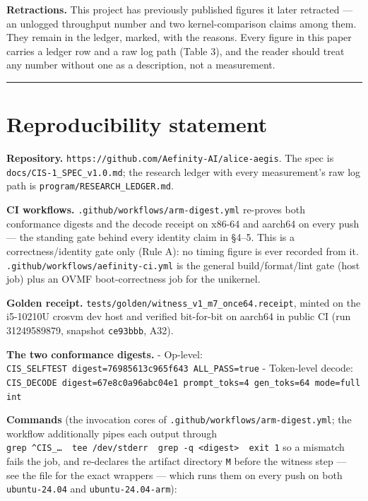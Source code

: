 \documentclass[11pt]{article}
\begin{document}
\textbf{Retractions.} This project has previously published figures it later retracted --- an unlogged
throughput number and two kernel-comparison claims among them. They remain in the ledger, marked,
with the reasons. Every figure in this paper carries a ledger row and a raw log path (Table 3),
and the reader should treat any number without one as a description, not a measurement.

\begin{center}\rule{0.5\linewidth}{0.5pt}\end{center}

\section{Reproducibility statement}\label{reproducibility-statement}

\textbf{Repository.} \texttt{https://github.com/Aefinity-AI/alice-aegis}. The spec is
\texttt{docs/CIS-1\_SPEC\_v1.0.md}; the research ledger with every measurement's raw
log path is \texttt{program/RESEARCH\_LEDGER.md}.

\textbf{CI workflows.} \texttt{.github/workflows/arm-digest.yml} re-proves both
conformance digests and the decode receipt on x86-64 and aarch64 on every
push --- the standing gate behind every identity claim in §4--5. This is a
correctness/identity gate only (Rule A): no timing figure is ever recorded
from it. \texttt{.github/workflows/aefinity-ci.yml} is the general build/format/lint
gate (host job) plus an OVMF boot-correctness job for the unikernel.

\textbf{Golden receipt.} \texttt{tests/golden/witness\_v1\_m7\_once64.receipt}, minted on
the i5-10210U crosvm dev host and verified bit-for-bit on aarch64 in public
CI (run 31249589879, snapshot \texttt{ce93bbb}, A32).

\textbf{The two conformance digests.}
- Op-level: \texttt{CIS\_SELFTEST\ digest=76985613c965f643\ ALL\_PASS=true}
- Token-level decode: \texttt{CIS\_DECODE\ digest=67e8c0a96abc04e1\ prompt\_toks=4\ gen\_toks=64\ mode=fullint}

\textbf{Commands} (the invocation cores of \texttt{.github/workflows/arm-digest.yml}; the workflow additionally pipes each output through \texttt{grep\ \textquotesingle{}\^{}CIS\_…\textquotesingle{}\ \textbar{}\ tee\ /dev/stderr\ \textbar{}\ grep\ -q\ \textless{}digest\textgreater{}\ \textbar{}\textbar{}\ exit\ 1} so a mismatch fails the job, and re-declares the artifact directory \texttt{M} before the witness step --- see the file for the exact wrappers --- which
runs them on every push on both \texttt{ubuntu-24.04} and \texttt{ubuntu-24.04-arm}):
\end{document}
